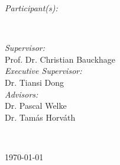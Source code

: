 \begin{titlepage}
\begin{minipage}{0.4\textwidth}
\begin{flushleft} \large
\emph{Participant(s):}\\
\@author %
\end{flushleft}
\end{minipage}
~
\begin{minipage}{0.4\textwidth}
\begin{flushright} \large
\emph{Supervisor:} \\
Prof. Dr. Christian Bauckhage\\[1.2em] \emph{Executive Supervisor:} \\
Dr. Tiansi Dong  \\[1.2em] 
\emph{Advisors:} \\
Dr. Pascal Welke\\Dr. Tam\'as Horv\'ath  
\end{flushright}
\end{minipage}\\[2cm]
\makeatother



{\large \today}\\[2cm] %

\vfill %

\end{titlepage}